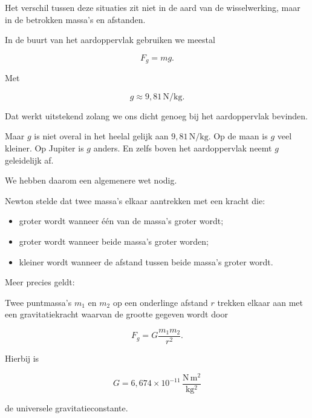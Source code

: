 \documentclass{ximera}
\begin{document}
Het verschil tussen deze situaties zit niet in de aard van de
wisselwerking, maar in de betrokken massa's en afstanden.




In de buurt van het aardoppervlak gebruiken we meestal

\[
F_g = mg.
\]

Met

\[
g\approx 9{,}81\,\mathrm{N/kg}.
\]

Dat werkt uitstekend zolang we ons dicht genoeg bij het aardoppervlak
bevinden.

Maar $g$ is niet overal in het heelal gelijk aan
$9{,}81\,\mathrm{N/kg}$. Op de maan is $g$ veel kleiner. Op Jupiter is $g$ anders. En zelfs boven het aardoppervlak neemt $g$ geleidelijk af.

We hebben daarom een algemenere wet nodig.




Newton stelde dat twee massa's elkaar aantrekken met een kracht die:

\begin{itemize}
  \item groter wordt wanneer één van de massa's groter wordt;
  \item groter wordt wanneer beide massa's groter worden;
  \item kleiner wordt wanneer de afstand tussen beide massa's groter
        wordt.
\end{itemize}

Meer precies geldt:


\begin{definitie}

Twee puntmassa's $m_1$ en $m_2$ op een onderlinge afstand $r$
trekken elkaar aan met een gravitatiekracht waarvan de grootte gegeven
wordt door

\[
\boxed{
F_g
=
G\frac{m_1m_2}{r^2}.
}
\]

Hierbij is

\[
G
=
6{,}674\times10^{-11}
\,
\mathrm{\frac{N\,m^2}{kg^2}}
\]

de universele gravitatieconstante.

\end{definitie}
\end{document}

